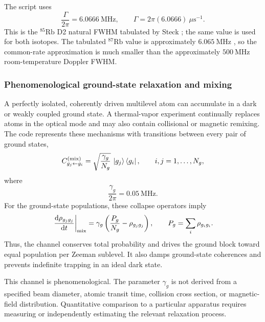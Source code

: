The script uses
\begin{equation}
\frac{\Gamma}{2\pi}=6.0666~\mathrm{MHz},
\qquad
\Gamma=2\pi(6.0666)~\mu\mathrm{s}^{-1}.
\label{eq:natural_linewidth_code}
\end{equation}
This is the \(^{85}\mathrm{Rb}\) D2 natural FWHM tabulated by Steck
\cite{Steck85}; the same value is used for both isotopes.  The tabulated
\(^{87}\mathrm{Rb}\) value is approximately \(6.065~\mathrm{MHz}\)
\cite{Steck87}, so the common-rate approximation is much smaller than the
approximately \(500~\mathrm{MHz}\) room-temperature Doppler FWHM.

\subsubsection{Phenomenological ground-state relaxation and mixing}

A perfectly isolated, coherently driven multilevel atom can accumulate in a
dark or weakly coupled ground state.  A thermal-vapor experiment continually
replaces atoms in the optical mode and may also contain collisional or
magnetic remixing.  The code represents these mechanisms with transitions
between every pair of ground states,
\begin{equation}
C_{g_j\leftarrow g_i}^{(\mathrm{mix})}
=
\sqrt{\frac{\gamma_g}{N_g}}\,
\left|g_j\right\rangle\left\langle g_i\right|,
\qquad i,j=1,\ldots,N_g,
\label{eq:ground_mixing_collapse}
\end{equation}
where
\begin{equation}
\frac{\gamma_g}{2\pi}=0.05~\mathrm{MHz}.
\end{equation}
For the ground-state populations, these collapse operators imply
\begin{equation}
\left.\frac{\mathrm{d}\rho_{g_jg_j}}{\mathrm{d}t}\right|_{\mathrm{mix}}
=
\gamma_g
\left(
\frac{P_g}{N_g}-\rho_{g_jg_j}
\right),
\qquad
P_g=\sum_i\rho_{g_ig_i}.
\label{eq:ground_mixing_population}
\end{equation}
Thus, the channel conserves total probability and drives the ground block
toward equal population per Zeeman sublevel.  It also damps ground-state
coherences and prevents indefinite trapping in an ideal dark state.

This channel is phenomenological.  The parameter \(\gamma_g\) is not derived
from a specified beam diameter, atomic transit time, collision cross section,
or magnetic-field distribution.  Quantitative comparison to a particular
apparatus requires measuring or independently estimating the relevant
relaxation process.

